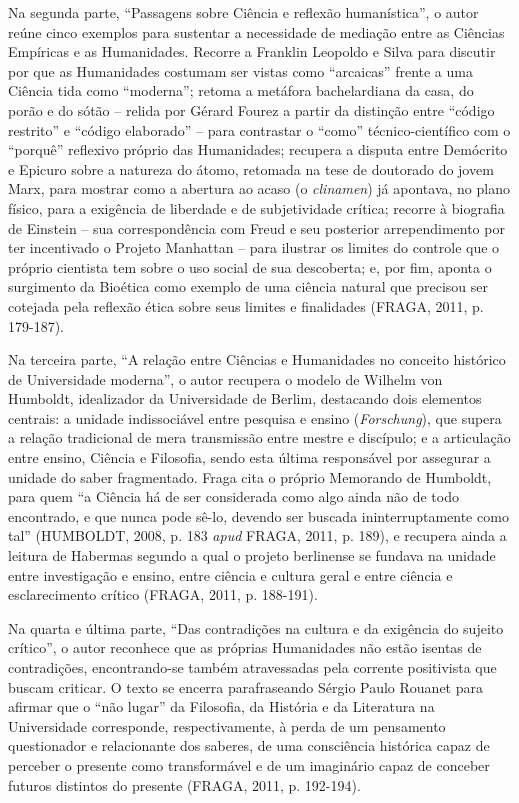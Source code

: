 \documentclass[12pt]{article}
\begin{document}
Na segunda parte, ``Passagens sobre Ciência e reflexão humanística'', o
autor reúne cinco exemplos para sustentar a necessidade de mediação entre
as Ciências Empíricas e as Humanidades. Recorre a Franklin Leopoldo e Silva
para discutir por que as Humanidades costumam ser vistas como ``arcaicas''
frente a uma Ciência tida como ``moderna''; retoma a metáfora bachelardiana
da casa, do porão e do sótão -- relida por Gérard Fourez a partir da
distinção entre ``código restrito'' e ``código elaborado'' -- para
contrastar o ``como'' técnico-científico com o ``porquê'' reflexivo próprio
das Humanidades; recupera a disputa entre Demócrito e Epicuro sobre a
natureza do átomo, retomada na tese de doutorado do jovem Marx, para
mostrar como a abertura ao acaso (o \emph{clinamen}) já apontava, no plano
físico, para a exigência de liberdade e de subjetividade crítica; recorre à
biografia de Einstein -- sua correspondência com Freud e seu posterior
arrependimento por ter incentivado o Projeto Manhattan -- para ilustrar os
limites do controle que o próprio cientista tem sobre o uso social de sua
descoberta; e, por fim, aponta o surgimento da Bioética como exemplo de uma
ciência natural que precisou ser cotejada pela reflexão ética sobre seus
limites e finalidades (FRAGA, 2011, p. 179-187).

Na terceira parte, ``A relação entre Ciências e Humanidades no conceito
histórico de Universidade moderna'', o autor recupera o modelo de Wilhelm
von Humboldt, idealizador da Universidade de Berlim, destacando dois
elementos centrais: a unidade indissociável entre pesquisa e ensino
(\emph{Forschung}), que supera a relação tradicional de mera transmissão
entre mestre e discípulo; e a articulação entre ensino, Ciência e
Filosofia, sendo esta última responsável por assegurar a unidade do saber
fragmentado. Fraga cita o próprio Memorando de Humboldt, para quem ``a
Ciência há de ser considerada como algo ainda não de todo encontrado, e que
nunca pode sê-lo, devendo ser buscada ininterruptamente como tal''
(HUMBOLDT, 2008, p. 183 \emph{apud} FRAGA, 2011, p. 189), e recupera ainda
a leitura de Habermas segundo a qual o projeto berlinense se fundava na
unidade entre investigação e ensino, entre ciência e cultura geral e entre
ciência e esclarecimento crítico (FRAGA, 2011, p. 188-191).

Na quarta e última parte, ``Das contradições na cultura e da exigência do
sujeito crítico'', o autor reconhece que as próprias Humanidades não estão
isentas de contradições, encontrando-se também atravessadas pela corrente
positivista que buscam criticar. O texto se encerra parafraseando Sérgio
Paulo Rouanet para afirmar que o ``não lugar'' da Filosofia, da História e
da Literatura na Universidade corresponde, respectivamente, à perda de um
pensamento questionador e relacionante dos saberes, de uma consciência
histórica capaz de perceber o presente como transformável e de um
imaginário capaz de conceber futuros distintos do presente (FRAGA, 2011, p.
192-194).
\end{document}
